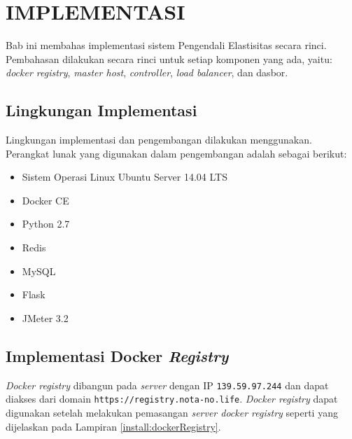 \chapter{IMPLEMENTASI}
	Bab ini membahas implementasi sistem Pengendali Elastisitas secara rinci. Pembahasan dilakukan secara rinci untuk setiap komponen yang ada, yaitu: \textit{docker registry}, \textit{master host}, \textit{controller}, \textit{load balancer}, dan dasbor.
    
    \section{Lingkungan Implementasi}
    	Lingkungan implementasi dan pengembangan dilakukan menggunakan. Perangkat lunak yang digunakan dalam pengembangan adalah sebagai berikut:
        \begin{itemize}
        \item Sistem Operasi Linux Ubuntu Server 14.04 LTS
        \item Docker CE
        \item Python 2.7
        \item Redis
        \item MySQL
        \item Flask
        \item JMeter 3.2
        \end{itemize}
        
	\section{Implementasi Docker \textit{Registry}}
    	\textit{Docker registry} dibangun pada \textit{server} dengan IP \texttt{139.59.97.244} dan dapat diakses dari domain \texttt{https://registry.nota-no.life}. \textit{Docker registry} dapat digunakan setelah melakukan pemasangan \textit{server docker registry} seperti yang dijelaskan pada Lampiran \ref{install:dockerRegistry}.
